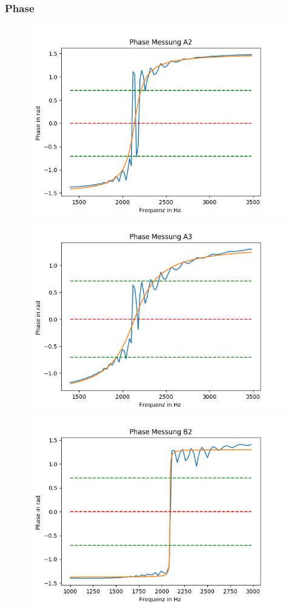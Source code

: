 \documentclass[12pt,a4paper]{article}
\begin{document}
\subsubsection{Phase}
\begin{figure}[H]
\centering
\includegraphics[scale=0.69]{Bilder/Parallel_Phase_2.png}
\includegraphics[scale=0.69]{Bilder/Parallel_Phase_3.png}
\includegraphics[scale=0.69]{Bilder/Parallel_PhaseB_2.png}
\end{figure}
\end{document}

